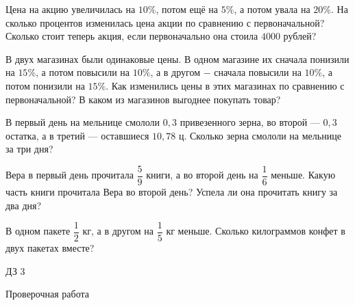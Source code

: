 \begin{homework}[number=2]
	\begin{listofex}
		\item Цена на акцию увеличилась на \(10\%\), потом ещё на \(5\%\), а потом увала на \(20\%\). На сколько процентов изменилась цена акции по сравнению с первоначальной? Сколько стоит теперь акция, если первоначально она стоила \(4000\) рублей?
		\item В двух магазинах были одинаковые цены. В одном магазине их сначала понизили на \(15\%\), а потом повысили на \(10\%\), а в другом − сначала повысили на \(10\%\), а потом понизили на \(15\%\). Как изменились цены в этих магазинах по сравнению с первоначальной? В каком из магазинов выгоднее покупать товар?
		\item В первый день на мельнице смололи \(0,3\) привезенного зерна, во второй --- \(0,3\) остатка, а в третий --- оставшиеся \(10,78\) ц. Сколько зерна смололи на мельнице за три дня?
		\item Вера в первый день прочитала \( \dfrac{5}{9} \) книги, а во второй день на \( \dfrac{1}{6} \) меньше. Какую часть книги прочитала Вера во второй день? Успела ли она прочитать книгу за два дня?
		\item В одном пакете \( \dfrac{1}{2} \) кг, а в другом на \(\dfrac{1}{5}\) кг меньше. Сколько килограммов конфет в двух пакетах вместе?
	\end{listofex}
\end{homework}

\begin{homework}[number=3]
	\begin{listofex}
		\item ДЗ 3
	\end{listofex}
\end{homework}

\begin{exam}
	\begin{listofex}
		\item Проверочная работа
	\end{listofex}
\end{exam}
